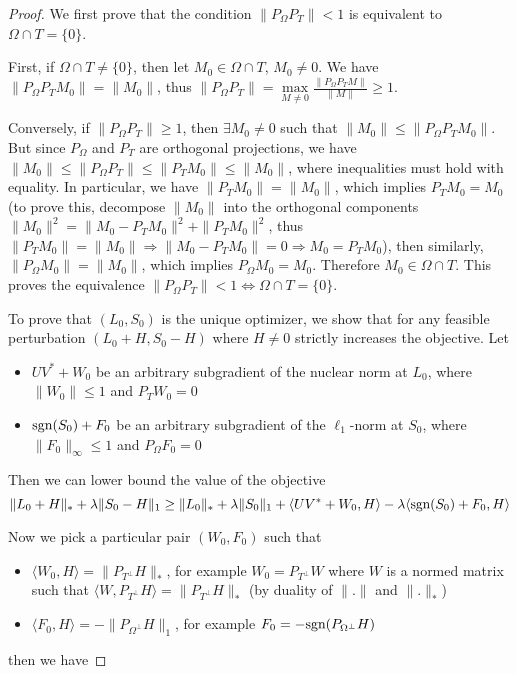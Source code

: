 \begin{proof}
We first prove that the condition $\|P_\Omega P_T\| < 1$ is equivalent to $\Omega \cap T = \{0\}$.

First, if $\Omega \cap T \neq \{0\}$, then let $M_0 \in \Omega \cap T$, $M_0 \neq 0$. We have $\| P_\Omega P_T M_0\| = \|M_0\|$, thus $\| P_\Omega P_T\| = \underset{M \neq 0}{\max} \frac{\| P_\Omega P_T M\|}{\|M\|} \geq 1$.

Conversely, if $\| P_\Omega P_T\| \geq 1$, then $\exists M_0 \neq 0$ such that $\|M_0\| \leq \| P_\Omega P_T M_0\|$. But since $P_\Omega$ and $P_T$ are orthogonal projections, we have $\|M_0\| \leq \| P_\Omega P_T\| \leq \|P_T M_0\| \leq \|M_0\|$, where inequalities must hold with equality. In particular, we have $\|P_T M_0\| = \|M_0\|$, which implies $P_T M_0 = M_0$ (to prove this, decompose $\|M_0\|$ into the orthogonal components $\|M_0\|^2 = \|M_0 - P_TM_0\|^2 + \|P_TM_0\|^2$, thus $\|P_TM_0\| = \|M_0\| \Rightarrow \|M_0 - P_TM_0\| = 0 \Rightarrow M_0 = P_T M_0$), then similarly, $\|P_\Omega M_0\| = \|M_0\|$, which implies $P_\Omega M_0 = M_0$. Therefore $M_0 \in \Omega \cap T$. This proves the equivalence $\|P_\Omega P_T\| < 1 \Leftrightarrow \Omega \cap T = \{0\}$.



To prove that $(L_0, S_0)$ is the unique optimizer, we show that for any feasible perturbation $(L_0 + H, S_0 - H)$ where $H \neq 0$ strictly increases the objective. Let
\begin{itemize}
\item $UV^* + W_0$ be an arbitrary subgradient of the nuclear norm at $L_0$, where $\|W_0\| \leq 1$ and $P_T W_0 = 0$
\item $\text{sgn} (S_0) + F_0$ be an arbitrary subgradient of the $\ell_1$-norm at $S_0$, where $\|F_0\|_\infty \leq 1$ and $P_\Omega F_0 = 0$
\end{itemize}

Then we can lower bound the value of the objective
\[
\|L_0 + H\|_* + \lambda \|S_0 - H\|_1 \geq \|L_0\|_* + \lambda \|S_0\|_1 + \langle UV^* + W_0, H\rangle - \lambda \langle \text{sgn}(S_0) + F_0, H\rangle
\]

Now we pick a particular pair $(W_0, F_0)$ such that
\begin{itemize}
\item $\langle W_0, H \rangle = \|P_{T^\perp} H\|_*$, for example $W_0 = P_{T^\perp} W$ where $W$ is a normed matrix such that $\langle W, P_{T^\perp} H \rangle = \|P_{T^\perp} H\|_*$ (by duality of $\|.\|$ and $\|.\|_*$)
\item $\langle F_0, H \rangle = -\|P_{\Omega^\perp} H\|_1$, for example $F_0 = -\text{sgn}(P_{\Omega^\perp} H)$
\end{itemize}
then we have


\end{proof}
